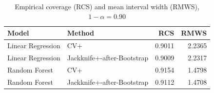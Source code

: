 \begin{table}[H]
\caption{Empirical coverage (RCS) and mean interval width (RMWS), $1-\alpha = 0.90$}
\label{tab:cp}
\begin{tabular}{llrr}
\toprule
Model & Method & RCS & RMWS \\
\midrule
Linear Regression & CV+ & 0.9011 & 2.2365 \\
Linear Regression & Jackknife+-after-Bootstrap & 0.9009 & 2.2317 \\
Random Forest & CV+ & 0.9154 & 1.4798 \\
Random Forest & Jackknife+-after-Bootstrap & 0.9112 & 1.4708 \\
\bottomrule
\end{tabular}
\end{table}
